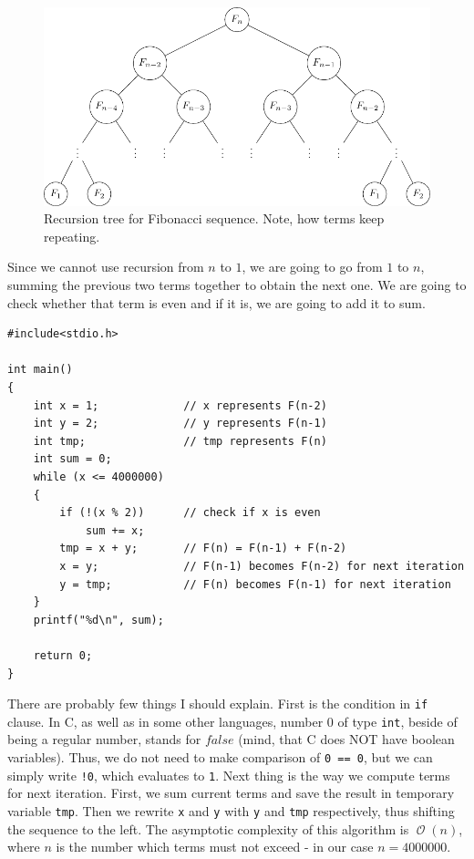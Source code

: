 \documentclass{book}
\DeclareMathOperator{\bigo}{\mathcal{O}}
\begin{document}
\begin{figure}[h!]
\centering
\includegraphics[scale=1]{images/002-tree.pdf}
\caption{Recursion tree for Fibonacci sequence. Note, how terms keep repeating.}
\end{figure}

Since we cannot use recursion from $n$ to $1$, we are going to go from $1$ to $n$, summing the previous two terms together to obtain the next one. We are going to check whether that term is even and if it is, we are going to add it to sum.

\begin{verbatim}
#include<stdio.h>

int main()
{
    int x = 1;             // x represents F(n-2)
    int y = 2;             // y represents F(n-1)
    int tmp;               // tmp represents F(n)
    int sum = 0;
    while (x <= 4000000)
    {
        if (!(x % 2))      // check if x is even
            sum += x;
        tmp = x + y;       // F(n) = F(n-1) + F(n-2)
        x = y;             // F(n-1) becomes F(n-2) for next iteration
        y = tmp;           // F(n) becomes F(n-1) for next iteration
    }
    printf("%d\n", sum);
    
    return 0;
}
\end{verbatim}

There are probably few things I should explain. First is the condition in \texttt{if} clause. In C, as well as in some other languages, number $0$ of type \texttt{int}, beside of being a regular number, stands for $\textit{false}$ (mind, that C does NOT have boolean variables). Thus, we do not need to make comparison of \texttt{0 == 0}, but we can simply write \texttt{!0}, which evaluates to \texttt{1}.
Next thing is the way we compute terms for next iteration. First, we sum current terms and save the result in temporary variable \texttt{tmp}. Then we rewrite \texttt{x} and \texttt{y} with \texttt{y} and \texttt{tmp} respectively, thus shifting the sequence to the left. The asymptotic complexity of this algorithm is $\bigo(n)$, where $n$ is the number which terms must not exceed - in our case $n = 4000000$.\\
\end{document}

